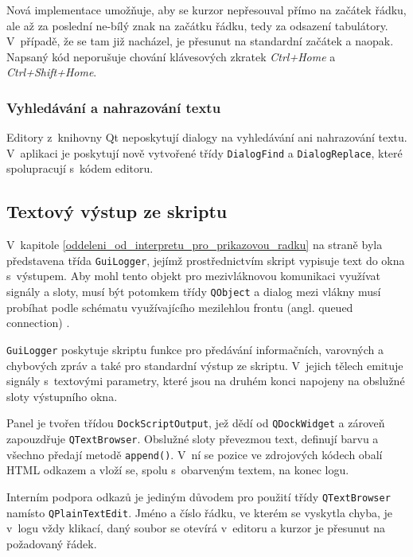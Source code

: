 \documentclass[11pt,twoside,a4paper]{book}
\begin{document}
Nová implementace umožňuje, aby se kurzor nepřesouval přímo na začátek řádku, ale až za poslední ne-bílý znak na začátku řádku, tedy za odsazení tabulátory. V~případě, že se tam již nacházel, je přesunut na standardní začátek a naopak. Napsaný kód neporušuje chování klávesových zkratek \textit{Ctrl+Home} a \textit{Ctrl+Shift+Home}.


\subsubsection{Vyhledávání a nahrazování textu}

Editory z~knihovny Qt neposkytují dialogy na vyhledávání ani nahrazování textu. V~aplikaci je poskytují nově vytvořené třídy \texttt{DialogFind} a \texttt{DialogReplace}, které spolupracují s~kódem editoru.


\subsection{Textový výstup ze skriptu}

V~kapitole \ref{oddeleni_od_interpretu_pro_prikazovou_radku} na straně \pageref{oddeleni_od_interpretu_pro_prikazovou_radku} byla představena třída \texttt{GuiLogger}, jejímž prostřednictvím skript vypisuje text do okna s~výstupem. Aby mohl tento objekt pro mezivláknovou komunikaci využívat signály a sloty, musí být potomkem třídy \texttt{QObject} a dialog mezi vlákny musí probíhat podle schématu využívajícího mezilehlou frontu (angl. queued connection) \cite{qt_threads}.

\texttt{GuiLogger} poskytuje skriptu funkce pro předávání informačních, varovných a chybových zpráv a také pro standardní výstup ze skriptu. V~jejich tělech emituje signály s~textovými parametry, které jsou na druhém konci napojeny na obslužné sloty výstupního okna.

Panel je tvořen třídou \texttt{DockScriptOutput}, jež dědí od \texttt{QDockWidget} a zároveň zapouzdřuje \texttt{QTextBrowser}. Obslužné sloty převezmou text, definují barvu a všechno předají metodě \texttt{append()}. V~ní se pozice ve zdrojových kódech obalí HTML odkazem a vloží se, spolu s~obarveným textem, na konec logu.

Interním podpora odkazů je jediným důvodem pro použití třídy \texttt{QTextBrowser} namísto \texttt{QPlainTextEdit}. Jméno a číslo řádku, ve kterém se vyskytla chyba, je v~logu vždy klikací, daný soubor se otevírá v~editoru a kurzor je přesunut na požadovaný řádek.
\end{document}
